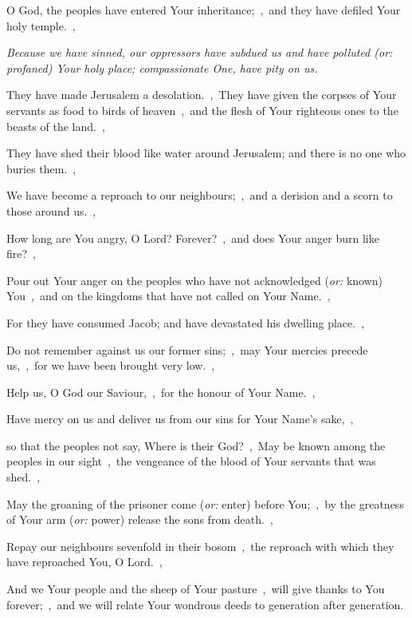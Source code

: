 \documentclass[12pt,twoside,a5paper]{article}
\newcommand{\qanona}[1]{{\liturgicalhint{Qanona.} \emph{#1}}}
\newcommand{\translationoption}[1]{\emph{or:} #1}
\begin{document}
\begin{normalparskip}
  O God, the peoples have entered Your inheritance;~\sep\ and they have defiled Your holy temple.~\sep

  \qanona{Because we have sinned, our oppressors have subdued us and have polluted (\translationoption{profaned}) Your holy place; compassionate One, have pity on us.}

  They have made Jerusalem a desolation.~\sep\ They have given the corpses of Your servants as food to birds of heaven~\sep\ and the flesh of Your righteous ones to the beasts of the land.~\sep

  They have shed their blood like water around Jerusalem; and there is no one who buries them.~\sep

  We have become a reproach to our neighbours;~\sep\ and a derision and a scorn to those around us.~\sep

  How long are You angry, O Lord? Forever?~\sep\ and does Your anger burn like fire?~\sep

  Pour out Your anger on the peoples who have not acknowledged (\translationoption{known}) You~\sep\ and on the kingdoms that have not called on Your Name.~\sep

  For they have consumed Jacob; and have devastated his dwelling place.~\sep

  Do not remember against us our former sins;~\sep\ may Your mercies precede us,~\sep\ for we have been brought very low.~\sep

  Help us, O God our Saviour,~\sep\ for the honour of Your Name.~\sep

  Have mercy on us and deliver us from our sins for Your Name's sake,~\sep

  so that the peoples not say, Where is their God?~\sep\ May be known among the peoples in our sight~\sep\ the vengeance of the blood of Your servants that was shed.~\sep

  May the groaning of the prisoner come (\translationoption{enter}) before You;~\sep\ by the greatness of Your arm (\translationoption{power}) release the sons from death.~\sep

  Repay our neighbours sevenfold in their bosom~\sep\ the reproach with which they have reproached You, O Lord.~\sep

  And we Your people and the sheep of Your pasture~\sep\ will give thanks to You forever;~\sep\ and we will relate Your wondrous deeds to generation after generation.
\end{normalparskip}
\end{document}
